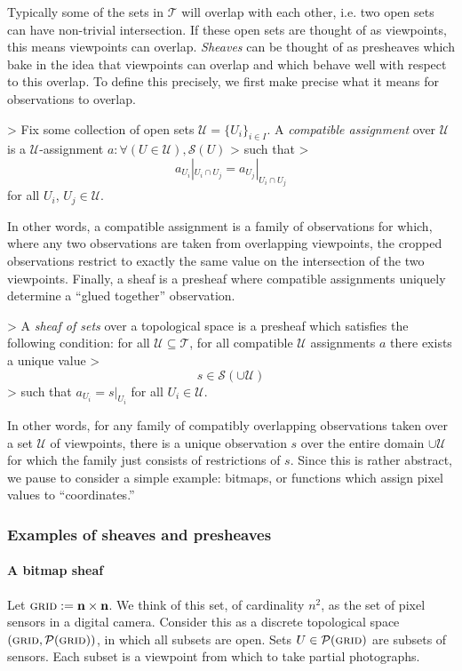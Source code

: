 Typically some of the sets in $\mathcal{T}$ will overlap with each other, i.e. two open sets can have non-trivial intersection. If these open sets are thought of as viewpoints, this means viewpoints can overlap. \emph{Sheaves} can be thought of as presheaves which bake in the idea that viewpoints can overlap and which behave well with respect to this overlap. To define this precisely, we first make precise what it means for observations to overlap.

\begin{definition}
>   Fix some collection of open sets $\mathcal{U} = \{U_i\}_{i \in I}$. A \emph{compatible assignment} over $\mathcal{U}$ is a $\mathcal{U}$-assignment $a : \forall (U \in \mathcal{U}), \mathcal{S}(U)$
>   such that
>   \[a_{U_i} |_{U_i \cap U_j} = a_{U_j} |_{U_i \cap U_j}\] for all $U_i$, $U_j \in \mathcal{U}$.
\end{definition}
In other words, a compatible assignment is a family of observations for which, where any two observations are taken from overlapping viewpoints, the cropped observations restrict to exactly the same value on the intersection of the two viewpoints. Finally, a sheaf is a presheaf where compatible assignments uniquely determine a ``glued together'' observation.
\begin{definition}
>   A \emph{sheaf of sets} over a topological space is a presheaf which satisfies the following condition: for all $\mathcal{U}\subseteq \mathcal{T}$, for all compatible $\mathcal{U}$ assignments $a$ there exists a unique value
>   \[s\in \mathcal{S}(\cup \mathcal{U})\]
>   such that $a_{U_i} = s|_{U_i}$ for all $U_i \in \mathcal{U}$.
\end{definition}
In other words, for any family of compatibly overlapping observations taken over a set $\mathcal{U}$ of viewpoints, there is a unique observation $s$ over the entire domain $\cup \mathcal{U}$ for which the family just consists of restrictions of $s$. Since this is rather abstract, we pause to consider a simple example: bitmaps, or functions which assign pixel values to ``coordinates.''

\subsubsection{Examples of sheaves and presheaves}

\paragraph{A bitmap sheaf}
Let $\textsc{grid} := \mathbf{n} \times \mathbf{n}$. We think of this set, of cardinality $n^2$, as the set of pixel sensors in a digital camera. Consider this as a discrete topological space $\left(\textsc{grid}, \mathcal{P}(\textsc{grid})\right)$, in which all subsets are open. Sets $U \in \mathcal{P}(\textsc{grid})$ are subsets of sensors. Each subset is a viewpoint from which to take partial photographs.


